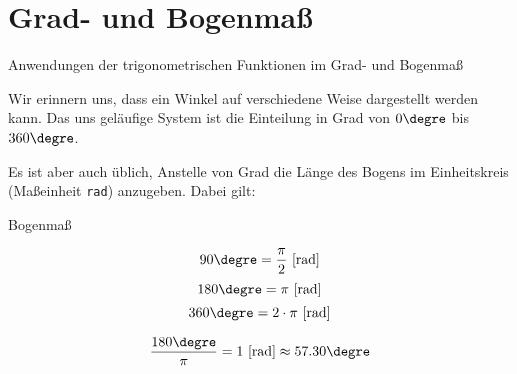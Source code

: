 
\section{Grad- und Bogenmaß}

Anwendungen der trigonometrischen Funktionen im Grad- und Bogenmaß

Wir erinnern uns, dass ein Winkel auf verschiedene Weise dargestellt
werden kann. Das uns geläufige System ist die Einteilung in Grad von
$0\degre$ bis $360\degre$.

Es ist aber auch üblich, Anstelle von Grad die Länge des Bogens im
Einheitskreis (Maßeinheit \texttt{rad}) anzugeben. Dabei gilt:

\begin{gesetz}{Bogenmaß}{}
  
  $$90\degre=\frac{\pi}2 \textrm{ [rad]}$$
  $$180\degre=\pi\textrm{ [rad]}$$
  $$360\degre=2\cdot{}\pi \textrm{ [rad]}$$

  $$\frac{180\degre}{\pi}  =1 \textrm{ [rad]} \approx{} 57.30\degre$$
  
\end{gesetz}

\newpage
